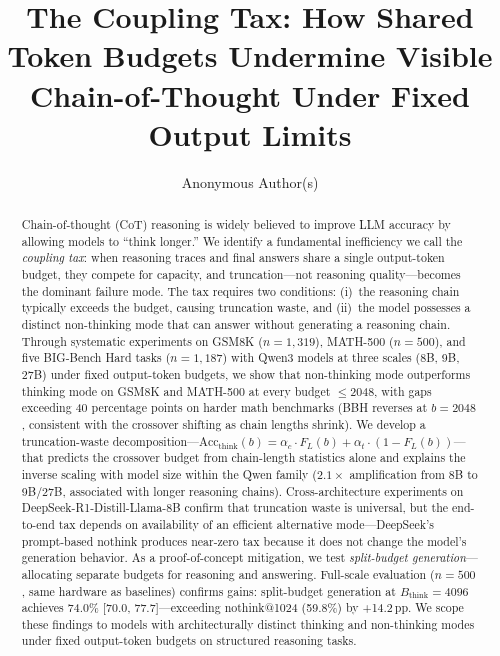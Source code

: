 \documentclass{article}
\title{The Coupling Tax: How Shared Token Budgets Undermine Visible Chain-of-Thought Under Fixed Output Limits}
\author{
  Anonymous Author(s)
}
\newcommand{\couplingtax}{\emph{coupling tax}}
\newcommand{\splitbudget}{\emph{split-budget generation}}
\theoremstyle{remark}
\begin{document}
\maketitle

\begin{abstract}
Chain-of-thought (CoT) reasoning is widely believed to improve LLM accuracy by allowing models to ``think longer.''
We identify a fundamental inefficiency we call the \couplingtax{}: when reasoning traces and final answers share a single output-token budget, they compete for capacity, and truncation---not reasoning quality---becomes the dominant failure mode.
The tax requires two conditions: (i)~the reasoning chain typically exceeds the budget, causing truncation waste, and (ii)~the model possesses a distinct non-thinking mode that can answer without generating a reasoning chain.
Through systematic experiments on GSM8K ($n{=}1{,}319$), MATH-500 ($n{=}500$), and five BIG-Bench Hard tasks ($n{=}1{,}187$) with Qwen3 models at three scales (8B, 9B, 27B) under fixed output-token budgets, we show that non-thinking mode outperforms thinking mode on GSM8K and MATH-500 at every budget $\leq$2048, with gaps exceeding 40 percentage points on harder math benchmarks (BBH reverses at $b{=}2048$, consistent with the crossover shifting as chain lengths shrink).
We develop a truncation-waste decomposition---$\mathrm{Acc}_{\mathrm{think}}(b) = \alpha_c \cdot F_L(b) + \alpha_t \cdot (1-F_L(b))$---that predicts the crossover budget from chain-length statistics alone and explains the inverse scaling with model size within the Qwen family ($2.1\times$ amplification from 8B to 9B/27B, associated with longer reasoning chains).
Cross-architecture experiments on DeepSeek-R1-Distill-Llama-8B confirm that truncation waste is universal, but the end-to-end tax depends on availability of an efficient alternative mode---DeepSeek's prompt-based nothink produces near-zero tax because it does not change the model's generation behavior.
As a proof-of-concept mitigation, we test \splitbudget{}---allocating separate budgets for reasoning and answering.
Full-scale evaluation ($n{=}500$, same hardware as baselines) confirms gains: split-budget generation at $B_{\text{think}}{=}4096$ achieves 74.0\% [70.0, 77.7]---exceeding nothink@1024 (59.8\%) by +14.2\,pp.
We scope these findings to models with architecturally distinct thinking and non-thinking modes under fixed output-token budgets on structured reasoning tasks.
\end{abstract}
\end{document}
